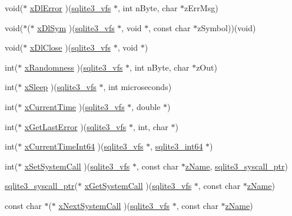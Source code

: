 \begin{DoxyCompactItemize}
\item 
void($\ast$ \hyperlink{structsqlite3__vfs_ace296f3efa5d1a490c892069891f37c0}{x\+Dl\+Error} )(\hyperlink{structsqlite3__vfs}{sqlite3\+\_\+vfs} $\ast$, int n\+Byte, char $\ast$z\+Err\+Msg)
\item 
void($\ast$($\ast$ \hyperlink{structsqlite3__vfs_a847ba7d9a80164138031aacef1d01507}{x\+Dl\+Sym} )(\hyperlink{structsqlite3__vfs}{sqlite3\+\_\+vfs} $\ast$, void $\ast$, const char $\ast$z\+Symbol))(void)
\item 
void($\ast$ \hyperlink{structsqlite3__vfs_a0cbdab1584e0e2a80b32b2c335f17f99}{x\+Dl\+Close} )(\hyperlink{structsqlite3__vfs}{sqlite3\+\_\+vfs} $\ast$, void $\ast$)
\item 
int($\ast$ \hyperlink{structsqlite3__vfs_ac74c20a91cbd440ed72b11de4c4333ea}{x\+Randomness} )(\hyperlink{structsqlite3__vfs}{sqlite3\+\_\+vfs} $\ast$, int n\+Byte, char $\ast$z\+Out)
\item 
int($\ast$ \hyperlink{structsqlite3__vfs_abd36ce64a27bd6c1b57a6f2c7031ff65}{x\+Sleep} )(\hyperlink{structsqlite3__vfs}{sqlite3\+\_\+vfs} $\ast$, int microseconds)
\item 
int($\ast$ \hyperlink{structsqlite3__vfs_a925aa81bcf67f2daf50ad59de850ef41}{x\+Current\+Time} )(\hyperlink{structsqlite3__vfs}{sqlite3\+\_\+vfs} $\ast$, double $\ast$)
\item 
int($\ast$ \hyperlink{structsqlite3__vfs_ae90895f142cc41801f515ae5e339a3d7}{x\+Get\+Last\+Error} )(\hyperlink{structsqlite3__vfs}{sqlite3\+\_\+vfs} $\ast$, int, char $\ast$)
\item 
int($\ast$ \hyperlink{structsqlite3__vfs_a2a344dbc5e4625343d992546fbff5421}{x\+Current\+Time\+Int64} )(\hyperlink{structsqlite3__vfs}{sqlite3\+\_\+vfs} $\ast$, \hyperlink{sqlite3_8h_a0a4d3e6c1ad46f90e746b920ab6ca0d2}{sqlite3\+\_\+int64} $\ast$)
\item 
int($\ast$ \hyperlink{structsqlite3__vfs_a444cd80f79ea4994f72551bb9f403866}{x\+Set\+System\+Call} )(\hyperlink{structsqlite3__vfs}{sqlite3\+\_\+vfs} $\ast$, const char $\ast$\hyperlink{structsqlite3__vfs_a0f06a27ac2201ea04c0623ef19e5d73e}{z\+Name}, \hyperlink{sqlite3_8h_a99a6393e96d7095fa024de9c1257aa6f}{sqlite3\+\_\+syscall\+\_\+ptr})
\item 
\hyperlink{sqlite3_8h_a99a6393e96d7095fa024de9c1257aa6f}{sqlite3\+\_\+syscall\+\_\+ptr}($\ast$ \hyperlink{structsqlite3__vfs_a1bf78a1603ab605cd92d146e3f810727}{x\+Get\+System\+Call} )(\hyperlink{structsqlite3__vfs}{sqlite3\+\_\+vfs} $\ast$, const char $\ast$\hyperlink{structsqlite3__vfs_a0f06a27ac2201ea04c0623ef19e5d73e}{z\+Name})
\item 
const char $\ast$($\ast$ \hyperlink{structsqlite3__vfs_afbd158883d9bb7954fa7ecd595fe3c2b}{x\+Next\+System\+Call} )(\hyperlink{structsqlite3__vfs}{sqlite3\+\_\+vfs} $\ast$, const char $\ast$\hyperlink{structsqlite3__vfs_a0f06a27ac2201ea04c0623ef19e5d73e}{z\+Name})
\end{DoxyCompactItemize}


